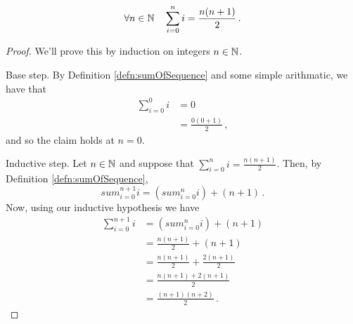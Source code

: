 \guard



\begin{prop}
\label{prop:sumOfConsequtiveIntegers}
  \[\forall n\in\mathbb{N}\quad\sum_{i=0}^n i = \frac{n(n+1)}{2}\,.\]
\end{prop}
\begin{proof}
  We'll prove this by induction on integers $n\in\mathbb{N}$.

  Base step.
  By Definition \ref{defn:sumOfSequence} and some simple arithmatic, we have that
    \begin{align*}
      \sum_{i=0}^0 i  &= 0 \\
                      &= \frac{ 0(0+1)}{2}\,,
    \end{align*}
  and so the claim holds at $n=0$.

  Inductive step. Let $n\in\mathbb{N}$ and suppose that $\sum_{i=0}^n i = \frac{n(n+1)}{2}$.
  Then, by Definition \ref{defn:sumOfSequence},
    \[ sum_{i=0}^{n+1} i = \left( sum_{i=0}^{n} i \right) + (n+1)\,. \]
  Now, using our inductive hypothesis we have
    \begin{align*}
      \sum_{i=0}^{n+1} i &= \left( sum_{i=0}^{n} i \right) + (n+1) \\
                        &= \frac{n(n+1)}{2} + (n+1) \\
                        &= \frac{n(n+1)}{2} + \frac{2(n+1)}{2} \\
                        &= \frac{ n(n+1)+2(n+1)}{2} \\
                        &= \frac{ (n+1)(n+2) }{2} \,.
    \end{align*}
\end{proof}
